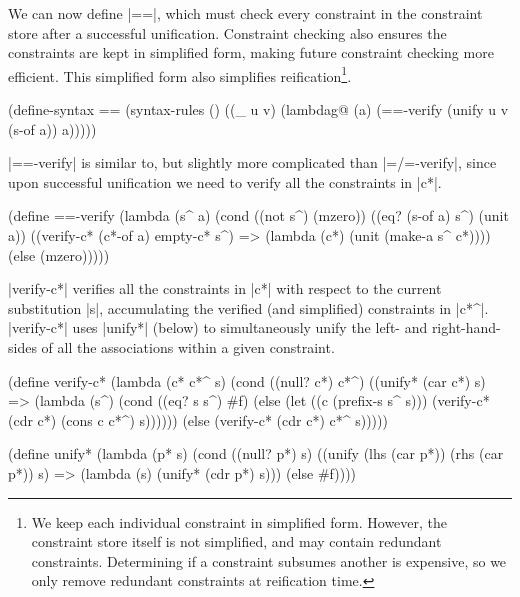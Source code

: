 We can now define \scheme|==|, which must check every constraint in
the constraint store after a successful unification.  Constraint
checking also ensures the constraints are kept in simplified form,
making future constraint checking more efficient.  This simplified
form also simplifies reification\footnote{We keep each individual
  constraint in simplified form.  However, the constraint store itself
  is not simplified, and may contain redundant constraints.
  Determining if a constraint subsumes another is expensive, so we
  only remove redundant constraints at reification time.}.

\schemedisplayspace
\begin{schemedisplay}
(define-syntax ==
  (syntax-rules ()
    ((_ u v)
     (lambdag@ (a)
       (==-verify (unify u v (s-of a)) a)))))
\end{schemedisplay}

\scheme|==-verify| is similar to, but slightly more complicated than
\scheme|=/=-verify|, since upon successful unification we need to
verify all the constraints in \scheme|c*|.

\newpage

\begin{schemedisplay}
(define ==-verify
  (lambda (s^ a)
    (cond
      ((not s^) (mzero))
      ((eq? (s-of a) s^) (unit a))
      ((verify-c* (c*-of a) empty-c* s^)
       => (lambda (c*) (unit (make-a s^ c*))))
      (else (mzero)))))
\end{schemedisplay}

\scheme|verify-c*| verifies all the constraints in \scheme|c*| with
respect to the current substitution \scheme|s|, accumulating the
verified (and simplified) constraints in \scheme|c*^|.
\scheme|verify-c*| uses \scheme|unify*| (below) to simultaneously
unify the left- and right-hand-sides of all the associations within a
given constraint.

\schemedisplayspace
\begin{schemedisplay}
(define verify-c*
  (lambda (c* c*^ s)
    (cond
      ((null? c*) c*^)
      ((unify* (car c*) s)
       => (lambda (s^)
            (cond
              ((eq? s s^) #f)
              (else (let ((c (prefix-s s^ s)))
                      (verify-c* (cdr c*) (cons c c*^) s))))))
      (else (verify-c* (cdr c*) c*^ s)))))

(define unify*
  (lambda (p* s)
    (cond
      ((null? p*) s)
      ((unify (lhs (car p*)) (rhs (car p*)) s)
       => (lambda (s) (unify* (cdr p*) s)))
      (else #f))))
\end{schemedisplay}

